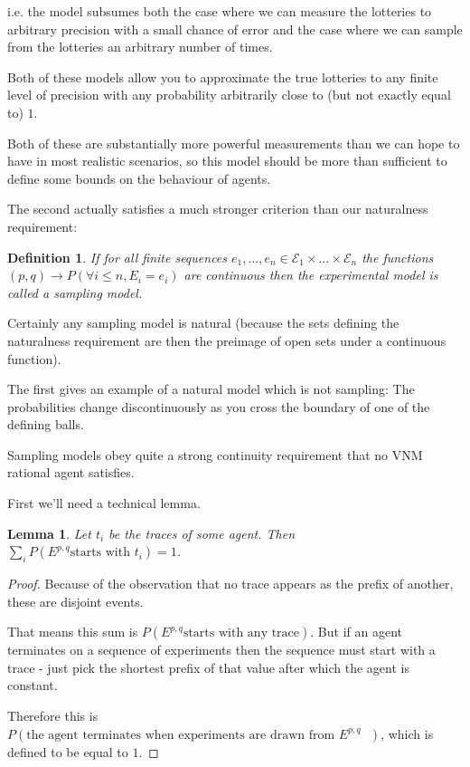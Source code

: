 \documentclass[a4paper]{book}
\newtheorem{definition}{Definition}[section]
\newtheorem{lemma}{Lemma}[section]
\begin{document}
i.e. the model subsumes both the case where we can measure  the lotteries to arbitrary
precision with a small chance of error and the case where we can sample from the
lotteries an arbitrary number of times.

Both of these models allow you to approximate the true lotteries to any
finite level of precision with any probability arbitrarily close to (but not exactly
equal to) $1$.

Both of these are substantially more powerful measurements than we can hope to have in
most realistic scenarios, so this model should be more than sufficient to define some
bounds on the behaviour of agents.

The second actually satisfies a much stronger criterion than our naturalness
requirement:

\begin{definition}
If for all finite sequences $e_1, \ldots, e_n \in \mathcal{E}_1 \times \ldots \times \mathcal{E}_n$
the functions $(p, q) \to P(\forall i \leq n, E_i = e_i)$ are continuous then 
the experimental model is called a sampling model.
\end{definition}

Certainly any sampling model is natural (because the sets defining the naturalness
requirement are then the preimage of open sets under a continuous function).

The first gives an example of a natural model which is not sampling: The probabilities
change discontinuously as you cross the boundary of one of the defining balls.

Sampling models obey quite a strong continuity requirement that no
VNM rational agent satisfies.

First we'll need a technical lemma.

\begin{lemma}
Let $t_i$ be the traces of some agent. Then 
$\sum\limits_i P(E^{p, q} \text{starts with $t_i$}) = 1$.
\end{lemma}

\begin{proof}
Because of the observation that no trace appears as the prefix of another, these are disjoint events.

That means this sum is $P(E^{p, q} \text{starts with any trace})$.
But if an agent terminates on a sequence of experiments then the
sequence must start with a trace - just pick the shortest prefix of that value
after which the agent is constant.

Therefore this is
$P(\text{the agent terminates when experiments are drawn from $E^{p, q}$ })$,
which is defined to be equal to $1$.
\end{proof}
\end{document}
